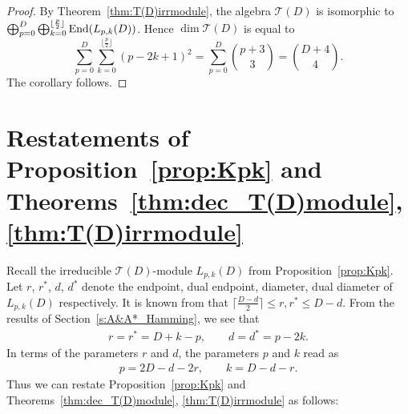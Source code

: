\documentclass[pdftex]{sigma}%
\def\End{{\rm End}}
\def\T{\mathcal T}
\numberwithin{equation}{section}
\begin{document}
\begin{proof}
By Theorem~\ref{thm:T(D)irrmodule}, the algebra $\T(D)$ is isomorphic to
$\bigoplus_{p=0}^D
\bigoplus_{k=0}^{\lfloor \frac{p}{2}\rfloor}
\End(L_{p,k}(D))$.
Hence $\dim \T(D)$ is equal to
\[
\sum_{p=0}^D
\sum_{k=0}^{\lfloor \frac{p}{2}\rfloor}
(p-2k+1)^2
=\sum_{p=0}^D {p+3\choose 3}
={D+4\choose 4}.
\]
The corollary follows.
\end{proof}

\appendix
\section{Restatements of Proposition~\ref{prop:Kpk} and Theorems~\ref{thm:dec_T(D)module}, \ref{thm:T(D)irrmodule}}\label{s:restate}

Recall the irreducible $\T(D)$-module $L_{p,k}(D)$ from Proposition~\ref{prop:Kpk}. Let $r$, $r^*$, $d$, $d^*$ denote the endpoint, dual endpoint, diameter, dual diameter of $L_{p,k}(D)$ respectively. It is known from \cite[p.~197]{TerAlgebraIII} that $\big\lceil \frac{D-d}{2}\big\rceil\leq r, r^* \leq D-d$.
From the results of Section~\ref{s:A&A*_Hamming}, we see that
\begin{align*}
r=r^*=D+k-p,\qquad
d=d^*=p-2k.
\end{align*}
In terms of the parameters $r$ and $d$, the parameters $p$ and $k$ read as
\begin{align*}
p=2D-d-2r,\qquad
k=D-d-r.
\end{align*}
Thus we can restate Proposition~\ref{prop:Kpk} and Theorems~\ref{thm:dec_T(D)module}, \ref{thm:T(D)irrmodule} as follows:
\end{document}

